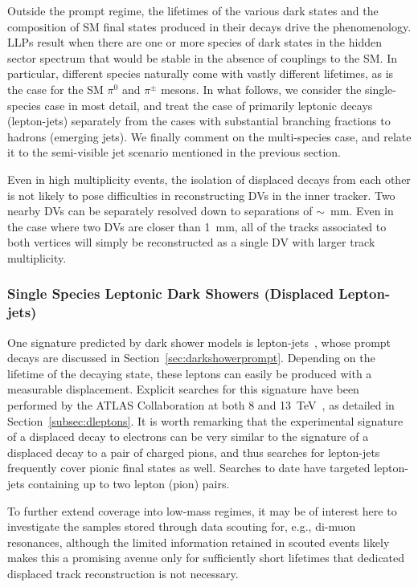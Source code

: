 Outside the prompt regime, the lifetimes of the various dark states and the composition of SM final states produced in their decays drive the phenomenology. LLPs result when there are one or more species of dark states in the hidden sector spectrum that would be stable in the absence of couplings to the SM. In particular, different species naturally come with vastly different lifetimes, as is the case for the SM $\pi^0$ and $\pi^\pm$ mesons. In what follows, we consider the single-species case in most detail, and treat the case of primarily leptonic decays (lepton-jets)  separately from the cases with substantial branching fractions to hadrons (emerging jets). We finally comment on the multi-species case, and relate it to the semi-visible jet scenario mentioned in the previous section.

Even in high multiplicity events, the isolation of displaced decays from each other is not likely to pose difficulties in reconstructing DVs in the inner tracker.  Two nearby DVs can be separately resolved down to separations of $\sim$~mm.  Even in the case where two DVs are closer than 1~mm, all of the tracks associated to both vertices will simply be reconstructed as a single DV with larger track multiplicity.

\subsubsection{Single Species Leptonic Dark Showers (Displaced Lepton-jets)}
\label{sec:leptonjetsoffline}
One signature predicted by dark shower models is lepton-jets~\cite{Falkowski:2010cm,Falkowski:2010gv}, whose prompt decays are discussed in Section~\ref{sec:darkshowerprompt}. Depending on the lifetime of the decaying state, these leptons can easily be produced with a measurable displacement. Explicit searches for this signature have been performed by the ATLAS Collaboration at both 8 and 13~TeV~\cite{Aad:2014yea, Aad:2019tua}, as detailed in Section~\ref{subsec:dleptons}. It is worth remarking that the experimental signature of a displaced decay to electrons can be very similar to the signature of a displaced decay to a pair of charged pions, and thus searches for lepton-jets frequently cover pionic final states as well. Searches to date have targeted lepton-jets containing up to two lepton (pion) pairs.

To further extend coverage into low-mass regimes, it may be of interest here to investigate the samples stored through data scouting for, e.g., di-muon resonances, although the limited information retained in scouted events likely makes this a promising avenue only for sufficiently short lifetimes that dedicated displaced track reconstruction is not necessary.

